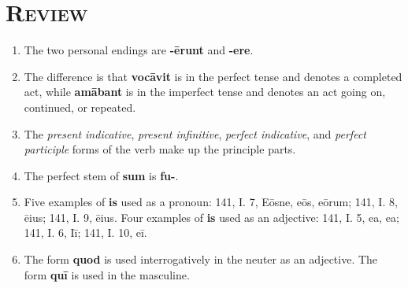 \documentclass[12pt]{article}
\begin{document}
\section{\textsc{Review}}
\begin{enumerate}[1.]
	\item The two personal endings are \textbf{-ērunt} and \textbf{-ere}.
	\item The difference is that \textbf{vocāvit} is in the perfect tense and denotes a completed act, while \textbf{amābant} is in the imperfect tense and denotes an act going on, continued, or repeated.
	\item The \textit{present indicative}, \textit{present infinitive}, \textit{perfect indicative}, and \textit{perfect participle} forms of the verb make up the principle parts.
	\item The perfect stem of \textbf{sum} is \textbf{fu-}.
	\item Five examples of \textbf{is} used as a pronoun: 141, I. 7, Eōsne, eōs, eōrum; 141, I. 8, ēius; 141, I. 9, ēius. Four examples of \textbf{is} used as an adjective: 141, I. 5, ea, ea; 141, I. 6, Iī; 141, I. 10, eī.
	\item The form \textbf{quod} is used interrogatively in the neuter as an adjective. The form \textbf{quī} is used in the masculine.
\end{enumerate}
\end{document}

